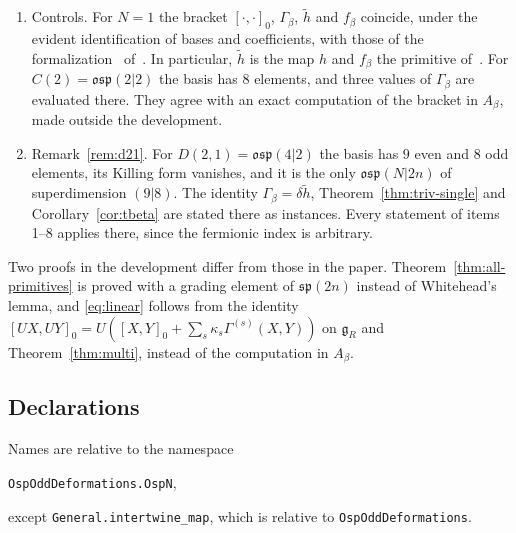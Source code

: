 \documentclass[11pt]{article}
\numberwithin{equation}{section}
\theoremstyle{definition}
\theoremstyle{remark}
\newcommand{\osp}{\mathfrak{osp}}
\begin{document}
\begin{enumerate}
\begin{enumerate}
$T^{(1)}\cdots T^{(r)}$ nor $U_{\le1}$ (\texttt{T1} in the development) intertwines $[\cdot,\cdot]_\beta$ with $[\cdot,\cdot]_0$;
for $u\neq v$, the $L_{uv}$-coefficient of the defect $[U_{\le1}L_{uu},U_{\le1}L_{vv}]_0-U_{\le1}[L_{uu},L_{vv}]_\beta$ is
$2\Omega_{uv}$;
\item Remark~\ref{rem:even}: $J-\Omega$ is equivalent to $J$ by
$\Theta=(\mathbb I+\Omega J)^{1/2}$ for every even antisymmetric $\Omega$ whose entries
have $\kappa$-degree~$2$.
\end{enumerate}
\item Controls. For $N=1$ the bracket $[\cdot,\cdot]_0$, $\Gamma_\beta$, $\tilde h$ and $f_\beta$
coincide, under the evident identification of bases and coefficients, with those of the
formalization~\cite{Repo} of~\cite{Aoi26}. In particular, $\tilde h$ is the map $h$ and
$f_\beta$ the primitive of~\cite[Theorem~4.1]{Aoi26}. For $C(2)=\osp(2|2)$ the basis has
$8$ elements, and three values of $\Gamma_\beta$ are evaluated there. They
agree with an exact computation of the bracket in $A_\beta$, made outside the
development.
\item Remark~\ref{rem:d21}. For $D(2,1)=\osp(4|2)$ the basis has $9$ even and $8$ odd
elements, its Killing form vanishes, and it is the only $\osp(N|2n)$ of superdimension
$(9|8)$. The identity $\Gamma_\beta=\delta\tilde h$, Theorem~\ref{thm:triv-single} and
Corollary~\ref{cor:tbeta} are stated there as instances. Every statement of items 1--8
applies there, since the fermionic index is arbitrary.
\end{enumerate}

Two proofs in the development differ from those in the paper. Theorem~\ref{thm:all-primitives} is proved
with a grading element of $\mathfrak{sp}(2n)$ instead of Whitehead's lemma, and \eqref{eq:linear}
follows from the identity $[UX,UY]_0=U([X,Y]_0+\sum_s\kappa_s\Gamma^{(s)}(X,Y))$ on $\mathfrak g_R$ and
Theorem~\ref{thm:multi}, instead of the computation in $A_\beta$.

\subsection{Declarations}\label{subsec:formal-binding}

Names are relative to the namespace
\begin{center}\texttt{OspOddDeformations.OspN},\end{center}
except \texttt{General.intertwine\_map}, which is relative to \texttt{OspOddDeformations}.
\end{document}
